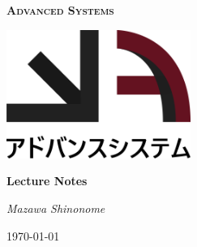 \documentclass[a4paper]{article}
\theoremstyle{remark}
\theoremstyle{remark}
\begin{document}
\begin{titlepage}
    \centering
    {\scshape\Huge \bfseries{Advanced Systems} \par}
    \par\vspace{1cm}
    \includegraphics[width=0.45\textwidth]{images/logo.png}\par
    \vspace{3cm}
    {\huge\bfseries Lecture Notes \par}
    \vspace{1cm}
    {\LARGE\itshape Mazawa Shinonome \par}
    \vspace{1cm}
    {\large\today\par}
    \vfill
    \begin{abstract}
        This document is a compilation of lecture notes for intermediate mathematics.
        It is intended to serve as a study guide for members of the Advanced System
        organization.
    \end{abstract}
\end{titlepage}

\newpage

\printnoidxglossary[type=\acronymtype]

\newpage

\tableofcontents
{}

\newpage











\newpage

\medskip
\printbibliography
\end{document}
